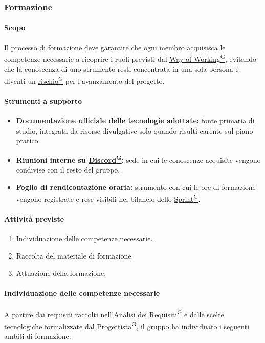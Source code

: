 \documentclass[a4paper,12pt]{article}
\providecommand{\glslink}[2]{\href{https://alittlebyte-19.github.io/Documentazione/glossario.html\#gls-#1}{\underline{#2}\textsuperscript{\scriptsize G}}}
\begin{document}
\subsubsection{Formazione}

\paragraph{Scopo}
Il processo di formazione deve garantire che ogni membro acquisisca le competenze necessarie a ricoprire i ruoli previsti dal \glslink{way-of-working-wow}{Way of Working}, evitando che la conoscenza di uno strumento resti concentrata in una sola persona e diventi un \glslink{rischio}{rischio} per l'avanzamento del progetto.

\paragraph{Strumenti a supporto}
\begin{itemize}
    \item \textbf{Documentazione ufficiale delle tecnologie adottate:} fonte primaria di studio, integrata da risorse divulgative solo quando risulti carente sul piano pratico.
    \item \textbf{Riunioni interne su \glslink{discord}{Discord}:} sede in cui le conoscenze acquisite vengono condivise con il resto del gruppo.
    \item \textbf{Foglio di rendicontazione oraria:} strumento con cui le ore di formazione vengono registrate e rese visibili nel bilancio dello \glslink{sprint}{Sprint}.
\end{itemize}

\paragraph{Attività previste}
\begin{enumerate}
    \item Individuazione delle competenze necessarie.
    \item Raccolta del materiale di formazione.
    \item Attuazione della formazione.
\end{enumerate}

\paragraph{Individuazione delle competenze necessarie}
A partire dai requisiti raccolti nell'\glslink{analisi-dei-requisiti-adr}{Analisi dei Requisiti} e dalle scelte tecnologiche formalizzate dal \glslink{progettista}{Progettista}, il gruppo ha individuato i seguenti ambiti di formazione:
\end{document}
